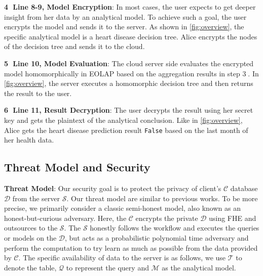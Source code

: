 \textbf{\textcircled{4} Line 8-9, Model Encryption}: In most cases, the user expects to 
get deeper insight from her data by an analytical model. To achieve such
a goal, the user encrypts the model and sends it to the server.
As shown in \cref{fig:overview}, the specific analytical model
is a heart disease decision tree. Alice encrypts the nodes of 
the decision tree and sends it to the cloud.

\textbf{\textcircled{5} Line 10, Model Evaluation}: The cloud server side evaluates the encrypted model homomorphically in EOLAP 
based on the aggregation results in step \textcircled{3}. 
In \cref{fig:overview}, the server executes a homomorphic decision tree 
and then returns the result to the user.

\textbf{\textcircled{6} Line 11, Result Decryption}: The user decrypts the result
using her secret key and gets the plaintext of the analytical conclusion.
Like in \cref{fig:overview}, Alice gets the heart disease 
prediction result \texttt{False} based on the last month of her health data.






\subsection{Threat Model and Security} \label{overview:threat_model}
{\bf{Threat Model}}: Our security goal is to protect the privacy of 
client's $\mathcal{C}$ database $\mathcal{D}$ from the server $\mathcal{S}$.
Our threat model are similar to previous works\cite{heda, sortinghat, sagma}. 
To be more precise, we primarily consider a classic semi-honest model,
also known as an honest-but-curious adversary.
Here, the $\mathcal{C}$ encrypts the private $\mathcal{D}$
using FHE and outsources to the $\mathcal{S}$. 
The $\mathcal{S}$ honestly follows the \NAME workflow and
executes the queries or models on the $\mathcal{D}$, but acts as 
a probabilistic polynomial time adversary and perform the computation to try
learn as much as possible from the data provided by $\mathcal{C}$.
The specific availability of data to the server is as follows, we 
use $\mathcal{T}$ to denote the table, $\mathcal{Q}$ to represent the 
query and $\mathcal{M}$ as the analytical model.

